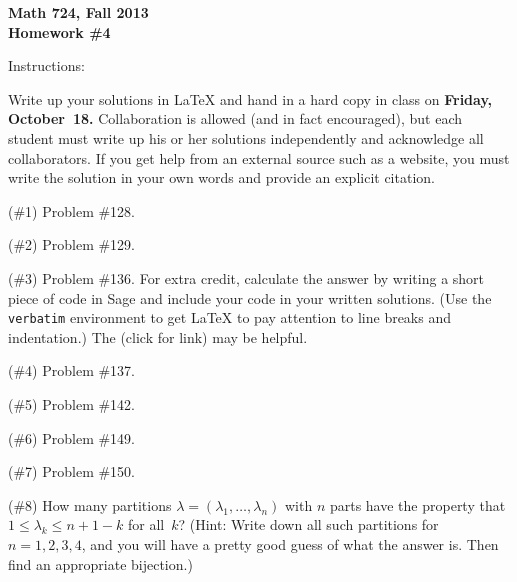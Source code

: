 
\setcounter{exprobno}{0}
\newcommand{\exprob}{\vskip10bp\addtocounter{probno}{1}{\bf(E{\arabic{probno}})}\quad}
\newcommand{\booksection}[1]{\bigskip\hrule\medskip\textbf{#1}}


{\bf Math 724, Fall 2013\\
Homework \#4

Instructions:} Write up your solutions in LaTeX and hand in a hard copy in class on {\bf Friday, October~18.}  Collaboration is allowed (and in fact encouraged), but each student must write up his or her solutions independently and acknowledge all collaborators.  If you get help from an external source such as a website, you must write the solution in your own words and provide an explicit citation.

(\#1) Problem \#128.%

(\#2) Problem \#129.%

(\#3) Problem \#136. %
For extra credit, calculate the answer by writing a short piece of code in Sage and include your code in your written solutions.  (Use the {\tt verbatim} environment to get LaTeX to pay attention to line breaks and indentation.)  The \href{http://www.jlmartin.faculty.ku.edu/math724/sage-vignette.pdf}{} (click for link) may be helpful.

(\#4) Problem \#137.%

(\#5) Problem \#142.%

(\#6) Problem \#149.

(\#7) Problem \#150.

(\#8)  How many partitions $\lambda=(\lambda_1,\dots,\lambda_n)$ with $n$ parts have the property that $1\leq\lambda_k\leq n+1-k$ for all~$k$?  (Hint: Write down all such partitions for $n=1,2,3,4$, and you will have a pretty good guess of what the answer is.  Then find an appropriate bijection.)

